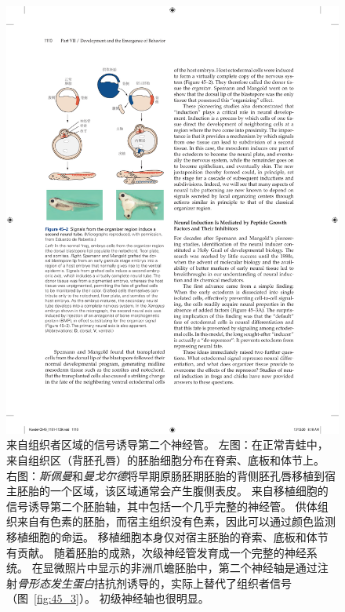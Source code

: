 \begin{figure}[htbp]
	\centering
	\includegraphics[width=0.62\linewidth]{chap45/fig_45_2}
	\caption{来自组织者区域的信号诱导第二个神经管。
		左图：在正常青蛙中，来自组织区（背胚孔唇）的胚胎细胞分布在脊索、底板和体节上。
		右图：\textit{斯佩曼}和\textit{曼戈尔德}将早期原肠胚期胚胎的背侧胚孔唇移植到宿主胚胎的一个区域，该区域通常会产生腹侧表皮。
		来自移植细胞的信号诱导第二个胚胎轴，其中包括一个几乎完整的神经管。
		供体组织来自有色素的胚胎，而宿主组织没有色素，因此可以通过颜色监测移植细胞的命运。
		移植细胞本身仅对宿主胚胎的脊索、底板和体节有贡献。
		随着胚胎的成熟，次级神经管发育成一个完整的神经系统。
		在显微照片中显示的非洲爪蟾胚胎中，第二个神经轴是通过注射\textit{骨形态发生蛋白}拮抗剂诱导的，实际上替代了组织者信号（图~\ref{fig:45_3}）。
		初级神经轴也很明显。}
	\label{fig:45_2}
\end{figure}


